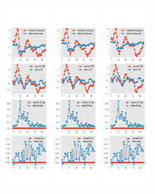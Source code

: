 \documentclass[]{article}
\begin{document}
\begin{figure}[ht]
\begin{subfigure}[b]{\textwidth}
		\includegraphics[width=0.19\textwidth]{figures/spf_ni_est_joint_diag1.png}
		\includegraphics[width=0.19\textwidth]{figures/spf_ni_est_joint_diag2.png}
		\includegraphics[width=0.19\textwidth]{figures/spf_ni_est_joint_diag3.png}

\end{subfigure}
\end{figure}
\end{document}
